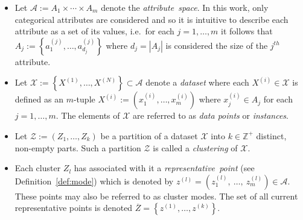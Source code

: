 \begin{itemize}
    \item Let \(\mathcal{A} := A_1 \times \cdots \times A_m\) denote the
        \emph{attribute~space}. In this work, only categorical attributes are
        considered and so it is intuitive to describe each attribute as a set of
        its values, i.e.\ for each \(j = 1, \ldots, m\) it follows that \(A_j :=
        \left\{a_1^{(j)}, \ldots, a_{d_j}^{(j)}\right\}\) where \(d_j = |A_j|\)
        is considered the size of the \(j^{th}\) attribute.

    \item Let \(\mathcal{X} := \left\{X^{(1)}, \ldots, X^{(N)}\right\} \subset
        \mathcal{A}\) denote a \emph{dataset} where each \(X^{(i)} \in
        \mathcal{X}\) is defined as an \(m\)-tuple \(X^{(i)} := \left(x_1^{(i)},
        \ldots, x_m^{(i)}\right)\) where \(x_j^{(i)} \in A_j\) for each \(j = 1,
        \ldots, m\). The elements of \(\mathcal{X}\) are referred to as
        \emph{data points} or \emph{instances}.

    \item Let \(\mathcal{Z} := \left(Z_1, \ldots, Z_k\right)\) be a partition
        of a dataset \(\mathcal{X}\) into \(k \in \mathbb{Z}^{+}\) distinct,
        non-empty parts. Such a partition \(\mathcal{Z}\) is called a
        \emph{clustering} of \(\mathcal{X}\).

    \item Each cluster \(Z_l\) has associated with it a
        \emph{representative~point} (see Definition~\ref{def:mode}) which is
        denoted by \(z^{(l)} = \left(z_1^{(l)},~\ldots,~z_m^{(l)}\right) \in
        \mathcal{A}\).  These points may also be referred to as cluster modes.
        The set of all current representative points is denoted \(\overline Z =
        \left\{z^{(1)}, \ldots, z^{(k)}\right\}\).
\end{itemize}

